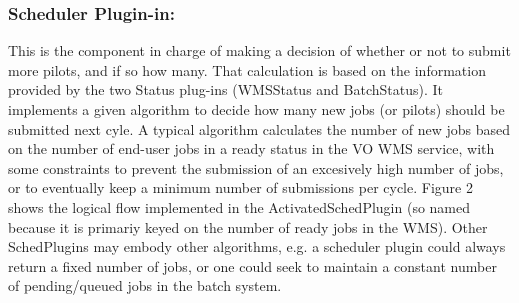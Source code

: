 \documentclass[a4paper]{jpconf}
\begin{document}
\subsubsection{Scheduler Plugin-in:}
This is the component in charge of making a decision of whether or not to submit
more pilots, and if so how many. That calculation is based on the information
provided by the two Status plug-ins (WMSStatus and BatchStatus).
It implements a given algorithm to decide how many new jobs (or pilots) should be submitted next cyle. 
A typical algorithm calculates the number of new jobs based on the number of end-user jobs in a ready status in the VO WMS service, 
with some constraints to prevent the submission of an excesively high number of jobs, 
or to eventually keep a minimum number of submissions per cycle. 
Figure 2 shows the logical flow implemented in the
ActivatedSchedPlugin (so named because it is primariy keyed on the number of
ready jobs in the WMS). Other SchedPlugins may embody other algorithms, e.g. a
scheduler plugin could always return a fixed number of jobs, or one could seek
to maintain a constant number of pending/queued jobs in the batch system. 
\end{document}
